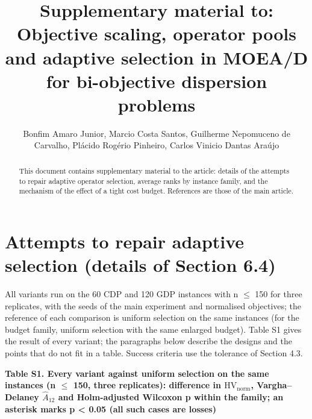 \documentclass[final,3p,times,11pt,authoryear]{elsarticle}
\begin{document}
\begin{frontmatter}
\title{Supplementary material to: Objective scaling, operator pools and adaptive selection in MOEA/D for bi-objective dispersion problems}
\author{Bonfim Amaro Junior, Marcio Costa Santos, Guilherme Nepomuceno de Carvalho, Plácido Rogério Pinheiro, Carlos Vinicio Dantas Araújo}
\begin{abstract}
This document contains supplementary material to the article: details of the attempts to repair adaptive operator selection, average ranks by instance family, and the mechanism of the effect of a tight cost budget. References are those of the main article.
\end{abstract}
\end{frontmatter}

\section{Attempts to repair adaptive selection (details of Section 6.4)}

All variants run on the 60 CDP and 120 GDP instances with n $\leq$ 150 for three replicates, with the seeds of the main experiment and normalised objectives; the reference of each comparison is uniform selection on the same instances (for the budget family, uniform selection with the same enlarged budget). Table S1 gives the result of every variant; the paragraphs below describe the designs and the points that do not fit in a table. Success criteria use the tolerance of Section 4.3.

\textbf{Table S1. Every variant against uniform selection on the same instances (n $\leq$ 150, three replicates): difference in $\mathrm{HV}_{\mathrm{norm}}$, Vargha--Delaney $\hat{A}_{12}$ and Holm-adjusted Wilcoxon p within the family; an asterisk marks p < 0.05 (all such cases are losses)}
\end{document}
